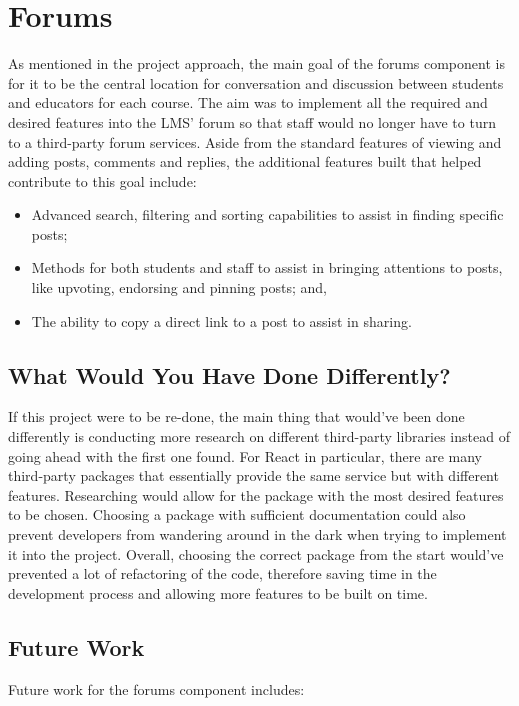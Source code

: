 \section{Forums}

As mentioned in the project approach, the main goal of the forums component is for it to be the central location for conversation and discussion between students and educators for each course.
The aim was to implement all the required and desired features into the LMS' forum so that staff would no longer have to turn to a third-party forum services.
Aside from the standard features of viewing and adding posts, comments and replies, the additional features built that helped contribute to this goal include:

\begin{itemize}
    \item Advanced search, filtering and sorting capabilities to assist in finding specific posts;
    \item Methods for both students and staff to assist in bringing attentions to posts, like upvoting, endorsing and pinning posts; and,
    \item The ability to copy a direct link to a post to assist in sharing.
\end{itemize}

\subsection{What Would You Have Done Differently?}

If this project were to be re-done, the main thing that would've been done differently is conducting more research on different third-party libraries instead of going ahead with the first one found.
For React in particular, there are many third-party packages that essentially provide the same service but with different features.
Researching would allow for the package with the most desired features to be chosen.
Choosing a package with sufficient documentation could also prevent developers from wandering around in the dark when trying to implement it into the project.
Overall, choosing the correct package from the start would've prevented a lot of refactoring of the code, therefore saving time in the development process and allowing more features to be built on time.

\subsection{Future Work}
Future work for the forums component includes:

